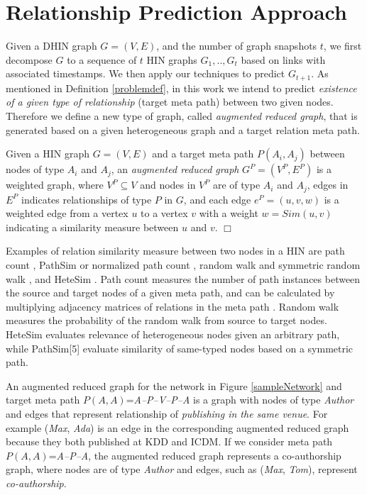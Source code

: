 \section{Relationship Prediction Approach}

Given a DHIN graph $G=(V,E)$, and the number of graph snapshots $t$, we first decompose $G$ to a sequence of $t$ HIN graphs ${G_1, .., G_t}$ based on links with associated timestamps. We then apply our techniques to predict $G_{t+1}$. As mentioned in Definition \ref{problemdef}, in this work we intend to predict \textit{existence of a given type of relationship} (target meta path) between two given nodes. Therefore we define a new type of graph, called \textit{augmented reduced graph}, that is generated based on a given heterogeneous graph and a target relation meta path. 

\begin{definition}\label{def:ARG}
Given a HIN graph $G=(V,E)$ and a target meta path $P(A_i,A_j)$ between nodes of type $A_i$ and $A_j$, an \textit{augmented reduced graph} $G^P=(V^P,E^P)$ is a weighted graph, where $V^P \subseteq V$ and nodes in $V^P$ are of type $A_i$ and $A_j$, edges in $E^P$ indicates relationships of type $P$ in $G$, and each edge $e^P = (u, v, w)$ is a weighted edge from a vertex $u$ to a vertex $v$ with a weight $w=Sim(u,v)$ indicating a similarity measure between $u$ and $v$. $\Box$
\end{definition}


Examples of relation similarity measure between two nodes in a HIN are path count \cite{sun2011pathsim,sun2011ASONAM}, PathSim \cite{sun2011pathsim} or normalized path count \cite{sun2011ASONAM}, random walk and symmetric random walk \cite{sun2011ASONAM}, and HeteSim \cite{shi2014hetesim}. Path count measures the number of path instances between the source and target nodes of a given meta path, and can be calculated by multiplying adjacency matrices of relations in the meta path \cite{sun2011ASONAM}. Random walk measures the probability of the random walk from source to target nodes. HeteSim evaluates relevance of heterogeneous nodes given an arbitrary path, while PathSim[5] evaluate similarity of same-typed nodes based on a symmetric path.

An augmented reduced graph for the network in Figure \ref{sampleNetwork} and target meta path $P(A,A)$=\textit{A--P--V--P--A} is a graph with nodes of type \textit{Author} and edges that represent relationship of \textit{publishing in the same venue}. For example (\textit{Max}, \textit{Ada}) is an edge in the corresponding augmented reduced graph because they both published at KDD and ICDM. If we consider meta path $P(A,A)$=\textit{A--P--A}, the augmented reduced graph represents a co-authorship graph, where nodes are of type \textit{Author} and edges, such as (\textit{Max}, \textit{Tom}), represent \textit{co-authorship}.  



